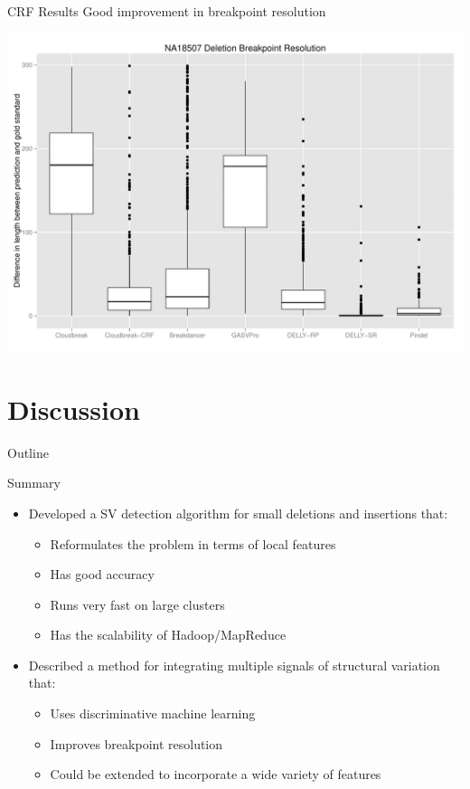 \documentclass{beamer}
\begin{document}
\begin{frame}{CRF Results}
 Good improvement in breakpoint resolution
 \begin{center}
   \includegraphics[height=.7\textheight,keepaspectratio]{breakpointResolutionNA18507_withCRF.pdf}
 \end{center}
\end{frame}

\section{Discussion}
\begin{frame}{Outline}
  \tableofcontents[currentsection]
\end{frame}

\begin{frame}{Summary}
  \begin{itemize}
    \item Developed a SV detection algorithm for small deletions and insertions that:
      \begin{itemize}
        \item Reformulates the problem in terms of local features
        \item Has good accuracy
        \item Runs very fast on large clusters
        \item Has the scalability of Hadoop/MapReduce
      \end{itemize}
    \item Described a method for integrating multiple signals of structural variation that:
      \begin{itemize}
        \item Uses discriminative machine learning
        \item Improves breakpoint resolution
        \item Could be extended to incorporate a wide variety of features
       \end{itemize}
   \end{itemize}
\end{frame}
\end{document}
